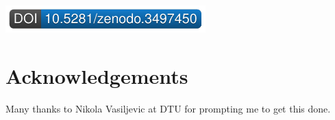 \documentclass[10pt,]{article}
\begin{document}
\href{https://doi.org/10.5281/zenodo.3497450}{\includegraphics{DOIBadgeGenerator.pdf}}

\hypertarget{acknowledgements}{%
\section*{Acknowledgements}\label{acknowledgements}}

Many thanks to Nikola Vasiljevic at DTU for prompting me to get this done.

\renewcommand\refname{Bibliography}

\end{document}
